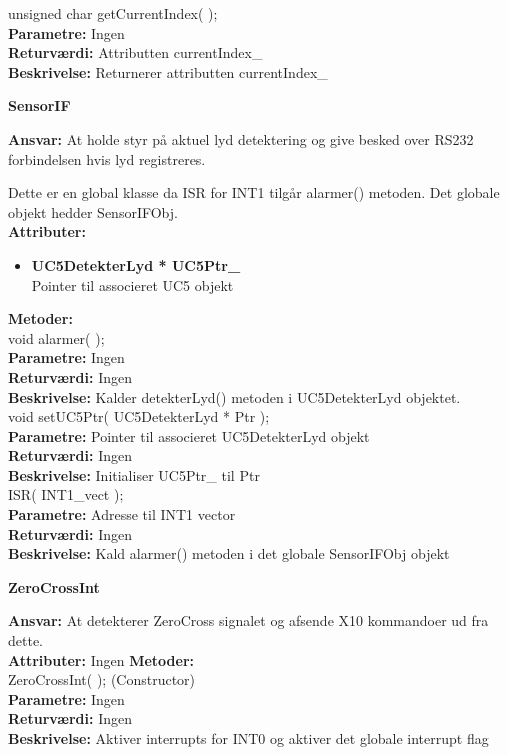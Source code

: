 unsigned char getCurrentIndex( ); \\
\textbf{Parametre:} Ingen \\
\textbf{Returværdi:} Attributten currentIndex\_ \\
\textbf{Beskrivelse:} Returnerer attributten currentIndex\_ \\

%
%
{\centering
\textbf{SensorIF}\par
}
\textbf{Ansvar:} At holde styr på aktuel lyd detektering og give besked over RS232 forbindelsen hvis lyd registreres.

Dette er en global klasse da ISR for INT1 tilgår alarmer() metoden. Det globale objekt hedder SensorIFObj. \\
\textbf{Attributer:}
\begin{itemize}
	\item \textbf{UC5DetekterLyd * UC5Ptr\_} \\
	Pointer til associeret UC5 objekt
\end{itemize}

\textbf{Metoder:} \\
void alarmer( ); \\
\textbf{Parametre:} Ingen \\
\textbf{Returværdi:} Ingen \\
\textbf{Beskrivelse:} Kalder detekterLyd() metoden i UC5DetekterLyd objektet. \\

void setUC5Ptr( UC5DetekterLyd * Ptr ); \\
\textbf{Parametre:} Pointer til associeret UC5DetekterLyd objekt \\
\textbf{Returværdi:} Ingen \\
\textbf{Beskrivelse:} Initialiser UC5Ptr\_ til Ptr \\

ISR( INT1\_vect ); \\
\textbf{Parametre:} Adresse til INT1 vector \\
\textbf{Returværdi:} Ingen \\
\textbf{Beskrivelse:} Kald alarmer() metoden i det globale SensorIFObj objekt \\

%
%
{\centering
\textbf{ZeroCrossInt}\par
}
\textbf{Ansvar:} At detekterer ZeroCross signalet og afsende X10 kommandoer ud fra dette.\\
\textbf{Attributer:} Ingen
\textbf{Metoder:} \\
ZeroCrossInt( ); (Constructor) \\
\textbf{Parametre:} Ingen \\
\textbf{Returværdi:} Ingen \\
\textbf{Beskrivelse:} Aktiver interrupts for INT0 og aktiver det globale interrupt flag \\

